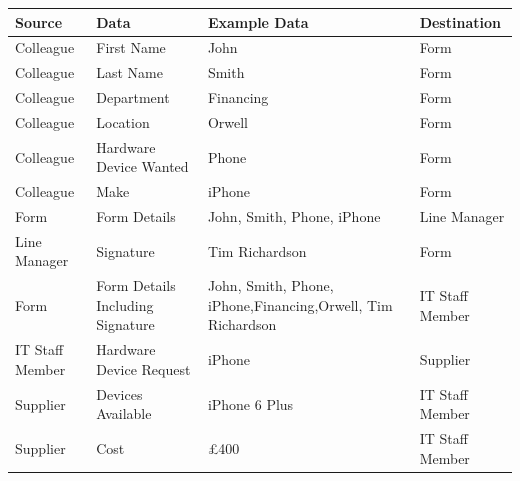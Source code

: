 \begin{center}
\begin{tabular}{|p{3cm}|p{3cm}|p{4cm}|p{3cm}|}
\hline
\textbf{Source} & \textbf{Data} & \textbf{Example Data}      & \textbf{Destination} \\ \hline
Colleague                             & First Name                         & John                                               & Form                                      \\ \hline
Colleague                             & Last Name                          & Smith                                              & Form                                      \\ \hline
Colleague                             & Department                              & Financing                                            & Form                                      \\ \hline
Colleague                             & Location                              & Orwell                                            & Form                                      \\ \hline
Colleague                             & Hardware Device Wanted             & Phone                                              & Form                                      \\ \hline
Colleague                             & Make                               & iPhone                                             & Form                                      \\ \hline
Form                                  & Form Details                       & John, Smith, Phone, iPhone                 & Line Manager                              \\ \hline
Line Manager                          & Signature                          & Tim Richardson                                     & Form                                      \\ \hline
Form                                  & Form Details Including Signature   & John, Smith, Phone, iPhone,Financing,Orwell, Tim Richardson & IT Staff Member                           \\ \hline
IT Staff Member 	&Hardware Device Request & iPhone & Supplier 												\\ \hline
Supplier & Devices Available & iPhone 6 Plus & IT Staff Member \\ \hline
Supplier & Cost & £400 &IT Staff Member \\ \hline

\end{tabular}
\end{center}
